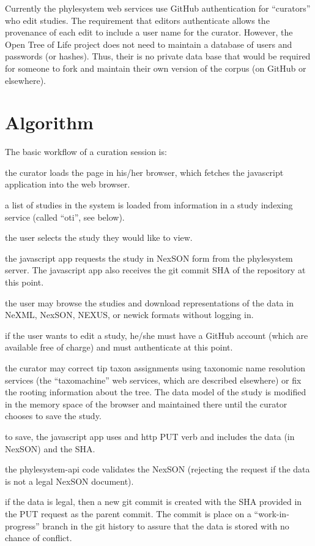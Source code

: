 \documentclass[a4paper,10pt]{article}
\newcommand{\ps}{phylesystem\xspace}
\newcommand{\otol}{Open Tree of Life\xspace}
\begin{document}
Currently the \ps web services use GitHub authentication for ``curators'' who edit studies.
The requirement that editors authenticate allows the provenance of each edit to include 
    a user name for the curator.
However, the \otol project does not need to maintain a database of users and passwords (or hashes).
Thus, their is no private data base that would be required for someone to fork and maintain their
    own version of the corpus (on GitHub or elsewhere).

\section{Algorithm}
The basic workflow of a curation session is:
\begin{compactenum}
    \item the curator loads the page in his/her browser, which fetches the javascript application into the web browser.
    \item a list of studies in the system is loaded from information in a study indexing service (called ``oti'', see below).
    \item the user selects the study they would like to view.
    \item the javascript app requests the study in NexSON form from the \ps server. The javascript app also receives the git commit SHA of the 
        repository at this point.
    \item the user may browse the studies and download representations of the data in NeXML, NexSON, NEXUS, or newick formats without logging in.
    \item if the user wants to edit a study, he/she must have a GitHub account (which are available free of charge) and must authenticate at this point.
    \item the curator may correct tip taxon assignments using taxonomic name resolution services (the ``taxomachine'' web services, which are described
        elsewhere) or fix the rooting information about the tree. The data model of the study is modified in the memory space of the 
        browser and maintained there until the curator chooses to save the study.
    \item to save, the javascript app uses and http PUT verb and includes the data (in NexSON) and the SHA.
    \item the \ps-api code validates the NexSON (rejecting the request if the data is not a legal NexSON document).
    \item if the data is legal, then a new git commit is created with the SHA provided in the PUT request as the parent commit. The commit is place on a ``work-in-progress'' branch in the git history to assure that the data is stored with no chance of conflict.

\end{compactenum}
\end{document}
